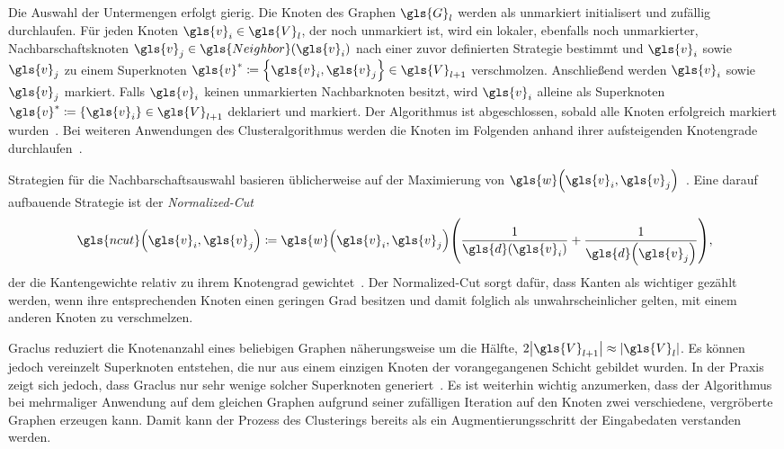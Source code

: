 Die Auswahl der Untermengen erfolgt gierig.
Die Knoten des Graphen $\gls{G}_l$ werden als unmarkiert initialisert und zufällig durchlaufen.
Für jeden Knoten $\gls{v}_i \in \gls{V}_l$, der noch unmarkiert ist, wird ein lokaler, ebenfalls noch unmarkierter, Nachbarschaftsknoten $\gls{v}_j \in \gls{Neighbor}\left(\gls{v}_i\right)$ nach einer zuvor definierten Strategie bestimmt und $\gls{v}_i$ sowie $\gls{v}_j$ zu einem Superknoten $\gls{v}^* \coloneqq \left\{ \gls{v}_i, \gls{v}_j \right\} \in \gls{V}_{l+1}$ verschmolzen.
Anschließend werden $\gls{v}_i$ sowie $\gls{v}_j$ markiert.
Falls $\gls{v}_i$ keinen unmarkierten Nachbarknoten besitzt, wird $\gls{v}_i$ alleine als Superknoten $\gls{v}^* \coloneqq \left\{ \gls{v}_i \right\} \in \gls{V}_{l+1}$ deklariert und markiert.
Der Algorithmus ist abgeschlossen, sobald alle Knoten erfolgreich markiert wurden~\cite{graclus}.
Bei weiteren Anwendungen des Clusteralgorithmus werden die Knoten im Folgenden anhand ihrer aufsteigenden Knotengrade durchlaufen~\cite{Defferrard}.

Strategien für die Nachbarschaftsauswahl basieren üblicherweise auf der Maximierung von $\gls{w}\left(\gls{v}_i, \gls{v}_j \right)$~\cite{graclus}.
Eine darauf aufbauende Strategie ist der \emph{Normalized-Cut}
\begin{equation*}
  \gls{ncut}\left(\gls{v}_i, \gls{v}_j\right) \coloneqq \gls{w}\left(\gls{v}_i, \gls{v}_j \right) \left(\frac{1}{\gls{d}\left(\gls{v}_i\right)} + \frac{1}{\gls{d}\left(\gls{v}_j\right)}\right),
\end{equation*}
der die Kantengewichte relativ zu ihrem Knotengrad gewichtet~\cite{Defferrard, graclus}.
Der Nor\-ma\-li\-zed-Cut sorgt dafür, dass Kanten als wichtiger gezählt werden, wenn ihre entsprechenden Knoten einen geringen Grad besitzen und damit folglich als unwahrscheinlicher gelten, mit einem anderen Knoten zu verschmelzen.

Graclus reduziert die Knotenanzahl eines beliebigen Graphen näherungsweise um die Hälfte, \dhe{} $2 \left|\gls{V}_{l+1}\right| \approx \left|\gls{V}_l\right|$.
Es können jedoch vereinzelt Superknoten entstehen, die nur aus einem einzigen Knoten der vorangegangenen Schicht gebildet wurden.
In der Praxis zeigt sich jedoch, dass Graclus nur sehr wenige solcher Superknoten generiert~\cite{Defferrard}.
Es ist weiterhin wichtig anzumerken, dass der Algorithmus bei mehrmaliger Anwendung auf dem gleichen Graphen aufgrund seiner zufälligen Iteration auf den Knoten zwei verschiedene, vergröberte Graphen erzeugen kann.
Damit kann der Prozess des Clusterings bereits als ein Augmentierungsschritt der Eingabedaten verstanden werden.

